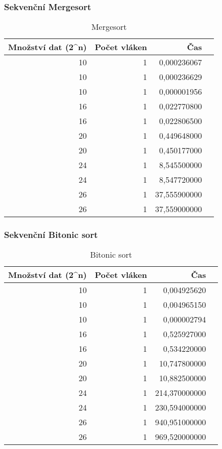 \documentclass[12pt]{article}
\begin{document}
\subsubsection{Sekvenční Mergesort}
\begin{table}[H]
\begin{center}
\begin{tabular}{|r|r|r|r|}
\hline Množství dat (2^n) & Počet vláken & Čas \\ \hline
10 & 1 &  0,000236067 \\ \hline
10 & 1 &  0,000236629 \\ \hline
10 & 1 &  0,000001956 \\ \hline
16 & 1 &  0,022770800 \\ \hline
16 & 1 &  0,022806500 \\ \hline
20 & 1 &  0,449648000 \\ \hline
20 & 1 &  0,450177000 \\ \hline
24 & 1 &  8,545500000 \\ \hline
24 & 1 &  8,547720000 \\ \hline
26 & 1 &  37,555900000 \\ \hline
26 & 1 &  37,559000000 \\ \hline
\end{tabular} 
\end{center}
\caption{Mergesort}
\end{table}


\subsubsection{Sekvenční Bitonic sort}
\begin{table}[H]
\begin{center}
\begin{tabular}{|r|r|r|r|}
\hline Množství dat (2^n) & Počet vláken & Čas \\ \hline
10  & 1 & 0,004925620 \\ \hline
10  & 1 & 0,004965150 \\ \hline
10  & 1 & 0,000002794 \\ \hline
16  & 1 & 0,525927000 \\ \hline
16  & 1 & 0,534220000 \\ \hline
20  & 1 & 10,747800000 \\ \hline
20  & 1 & 10,882500000 \\ \hline
24  & 1 & 214,370000000 \\ \hline
24  & 1 & 230,594000000 \\ \hline
26  & 1 & 940,951000000 \\ \hline
26  & 1 & 969,520000000 \\ \hline
\end{tabular} 
\end{center}
\caption{Bitonic sort}
\end{table}
\end{document}
